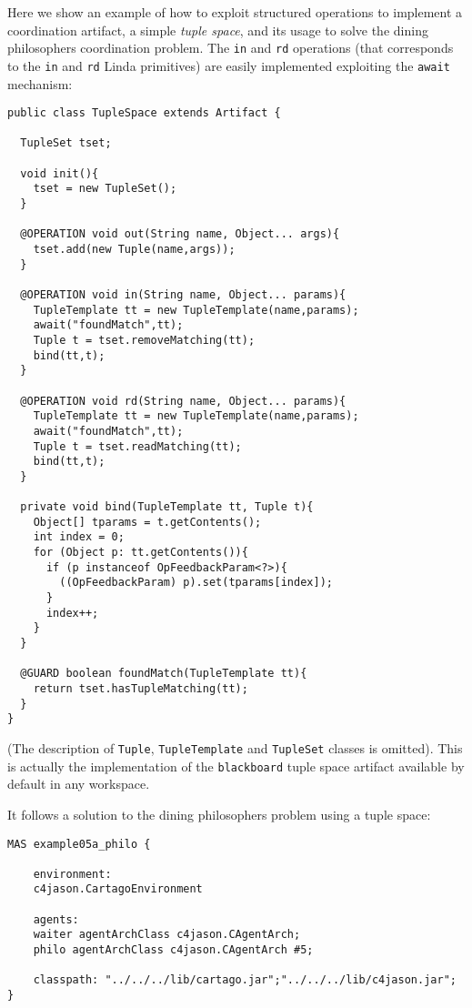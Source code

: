 \documentclass[11pt]{report}
\newcommand\code[1]{{\small{\mbox{\texttt{{#1}}}}}}
\begin{document}
Here we show an example of how to exploit structured operations to implement a coordination artifact, a simple \emph{tuple space}, and its usage to solve the dining philosophers coordination problem.
%
The \code{in} and \code{rd} operations (that corresponds to the \code{in} and \code{rd} Linda primitives) are easily implemented exploiting the \code{await} mechanism: 
%
{\small{
\begin{verbatim}
public class TupleSpace extends Artifact {
	
  TupleSet tset;
	
  void init(){
    tset = new TupleSet();
  }
	
  @OPERATION void out(String name, Object... args){
    tset.add(new Tuple(name,args));
  }
	
  @OPERATION void in(String name, Object... params){
    TupleTemplate tt = new TupleTemplate(name,params);
    await("foundMatch",tt);
    Tuple t = tset.removeMatching(tt);
    bind(tt,t);
  }

  @OPERATION void rd(String name, Object... params){
    TupleTemplate tt = new TupleTemplate(name,params);
    await("foundMatch",tt);
    Tuple t = tset.readMatching(tt);
    bind(tt,t);
  }
	
  private void bind(TupleTemplate tt, Tuple t){
    Object[] tparams = t.getContents();
    int index = 0;
    for (Object p: tt.getContents()){
      if (p instanceof OpFeedbackParam<?>){
        ((OpFeedbackParam) p).set(tparams[index]);
      }
      index++;
    }
  }
	
  @GUARD boolean foundMatch(TupleTemplate tt){
    return tset.hasTupleMatching(tt);
  }
}
\end{verbatim}}}
%
\noindent (The description of \code{Tuple}, \code{TupleTemplate} and \code{TupleSet} classes is omitted).
%
This is actually the implementation of the \code{blackboard} tuple space artifact available by default in any workspace.

\noindent It follows a solution to the dining philosophers problem using a tuple space:
% 
{\small{
\begin{verbatim}
MAS example05a_philo {

    environment: 
    c4jason.CartagoEnvironment

    agents:     	  
    waiter agentArchClass c4jason.CAgentArch;
    philo agentArchClass c4jason.CAgentArch #5;

    classpath: "../../../lib/cartago.jar";"../../../lib/c4jason.jar";    
}
\end{verbatim}}}
\end{document}
